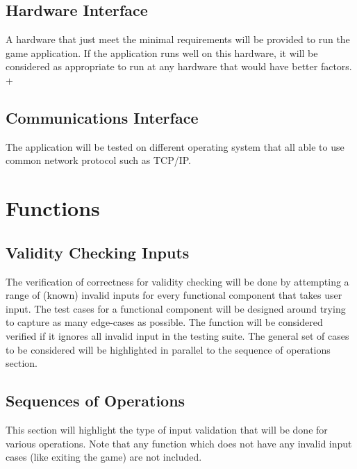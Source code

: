 \documentclass[12pt]{article}
\begin{document}
\subsection{Hardware Interface}
A hardware that just meet the minimal requirements will be provided to run the 
game application. If the application runs well on this hardware, it will be 
considered as appropriate to run at any hardware that would have better factors.
+
\subsection{Communications Interface}
The application will be tested on different operating system that all able to
use common network protocol such as TCP/IP.




\section{Functions}  
\subsection{Validity Checking Inputs}
The verification of correctness for validity checking will be done by attempting
a range of (known) invalid inputs for every functional component that takes user
input.  The test cases for a functional component will be designed around trying
to capture as many edge-cases as possible.  The function will be considered
verified if it ignores all invalid input in the testing suite. The general set
of cases to be considered will be highlighted in parallel to the sequence of
operations section.

\subsection{Sequences of Operations}

This section will highlight the type of input validation that will be done
for various operations.  Note that any function which does not have any invalid
input cases (like exiting the game) are not included.
\end{document}
